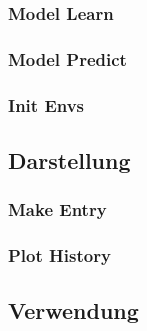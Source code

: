 \subsubsection{Model Learn}
\subsubsection{Model Predict}
\subsubsection{Init Envs}
\subsection{Darstellung}
\subsubsection{Make Entry}
\subsubsection{Plot History}
\subsection{Verwendung}